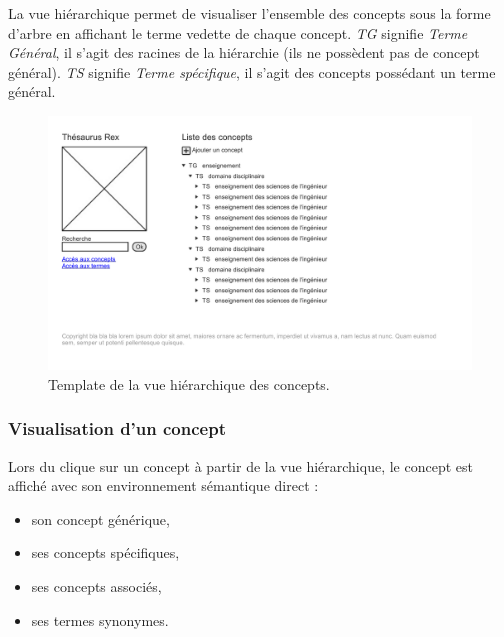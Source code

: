 La vue hiérarchique permet de visualiser l'ensemble des concepts sous la forme d'arbre en affichant le terme vedette de chaque concept. \emph{TG} signifie \emph{Terme Général},  il s'agit des racines de la hiérarchie (ils ne possèdent pas de concept général). \emph{TS} signifie \emph{Terme spécifique}, il s'agit des concepts possédant un terme général.
\begin{figure}[H]
\begin{center}
\includegraphics[width=\textwidth]{files/template_concepts}
\end{center}
\caption{Template de la vue hiérarchique des concepts.}
\end{figure}

\subsubsection{Visualisation d'un concept}

Lors du clique sur un concept à partir de la vue hiérarchique, le concept est affiché avec son environnement sémantique direct :
\begin{itemize}
\item son concept générique,
\item ses concepts spécifiques,
\item ses concepts associés,
\item ses termes synonymes.
\end{itemize}

